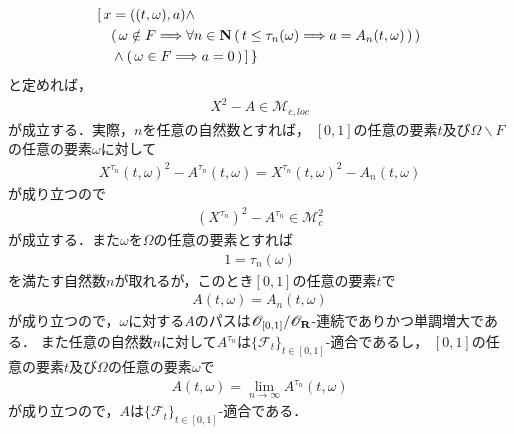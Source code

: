 \begin{sketch}
\begin{description}
\begin{align}
					&[\, x = ((t,\omega),a) \wedge \\
					&\quad (\, \omega \notin F \Longrightarrow \forall n \in \mathbf{N}\, 
					(\, t \leq \tau_{n}(\omega) \Longrightarrow a = A_{n}(t,\omega)\, )\, )\, \\
					&\quad \wedge (\, \omega \in F \Longrightarrow a = 0\, )\, ]\, \}
				\end{align}
				と定めれば，
				\begin{align}
					X^{2} - A \in \mathscr{M}_{c,loc}
				\end{align}
				が成立する．実際，$n$を任意の自然数とすれば，
				$[0,1]$の任意の要素$t$及び$\Omega \backslash F$の任意の要素$\omega$に対して
				\begin{align}
					{X^{\tau_{n}}(t,\omega)}^{2} - A^{\tau_{n}}(t,\omega)
					= {X^{\tau_{n}}(t,\omega)}^{2} - A_{n}(t,\omega)
				\end{align}
				が成り立つので
				\begin{align}
					\left(X^{\tau_{n}}\right)^{2} - A^{\tau_{n}} \in \mathscr{M}_{c}^{2}
				\end{align}
				が成立する．また$\omega$を$\Omega$の任意の要素とすれば
				\begin{align}
					1 = \tau_{n}(\omega)
				\end{align}
				を満たす自然数$n$が取れるが，このとき$[0,1]$の任意の要素$t$で
				\begin{align}
					A(t,\omega) = A_{n}(t,\omega)
				\end{align}
				が成り立つので，$\omega$に対する$A$のパスは$\mathscr{O}_{[0,1]}/\mathscr{O}_{\mathbf{R}}$-連続でありかつ単調増大である．
				また任意の自然数$n$に対して$A^{\tau_{n}}$は$\{\mathscr{F}_{t}\}_{t \in [0,1]}$-適合であるし，
				$[0,1]$の任意の要素$t$及び$\Omega$の任意の要素$\omega$で
				\begin{align}
					A(t,\omega) = \lim_{n \to \infty} A^{\tau_{n}}(t,\omega)
				\end{align}
				が成り立つので，$A$は$\{\mathscr{F}_{t}\}_{t \in [0,1]}$-適合である．
				

\end{description}
\end{sketch}
